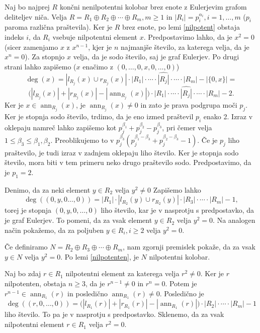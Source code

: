 \documentclass[a4paper, 12pt]{amsart}
\theoremstyle{definition} %
\theoremstyle{plain} %
\DeclareMathOperator{\ann}{ann}
\begin{document}
\proof
Naj bo najprej $R$ končni nenilpotentni kolobar brez enote z Eulerjevim grafom deliteljev niča. Velja $R=R_1\oplus R_2\oplus \cdots \oplus R_m, m\ge 1$ in $|R_i|=p_i^{\alpha_i}, i=1,\dots,m$ ($p_i$ paroma različna praštevila). Ker je $R$ brez enote, po lemi \ref{nilpotent} obstaja indeks $i$, da $R_i$ vsebuje nilpotentni element $x$. Predpostavimo lahko, da je $x^2 = 0$ (sicer zamenjamo $x$ z $x^{n-1}$, kjer je $n$ najmanjše število, za katerega velja, da je $x^n=0$). Za stopnjo $x$ velja, da je sodo število, saj je graf Eulerjev. Po  drugi  strani lahko zapišemo ($x$ enačimo z $(0,\dots,0,x,0,\dots,0)$)
$$
\deg(x) = |l_{R_j}(x) \cup r_{R_j}(x)|\cdot |R_1|\cdot \cdots \cdot \widehat{|R_j|} \cdot \cdots \cdot |R_m| - |\{0,x\}| = 
$$
$$
\big( |l_{R_j}(x)| + |r_{R_j}(x)| - |\ann_{R_j}(x)| \big)\cdot |R_1| \cdot \cdots \cdot \widehat{|R_j|} \cdot \cdots \cdot |R_m| - 2.
$$
Ker je $x\in \ann_{R_j}(x)$, je $\ann_{R_j}(x)\neq 0$ in zato je prava podgrupa moči $p_j$. Ker je stopnja sodo število, trdimo, da je eno izmed praštevil $p_i$ enako 2. Izraz v oklepaju namreč lahko zapišemo kot $p_j^{ \beta_1} + p_j^{\beta_2} - p_j^{\beta_3}$, pri čemer velja $1\le \beta_3 \le \beta_1,\beta_2$. Preoblikujemo to v $p_j^{\beta_3}(p_j^{\beta_1 - \beta_3} + p_j^{\beta_2 - \beta_3 } -1)$. Če je $p_j$ liho praštevilo, je tudi izraz v zadnjem oklepaju liho število. Ker je stopnja sodo število, mora biti v tem primeru neko drugo praštevilo sodo. Predpostavimo, da je $p_1 = 2$.

Denimo, da za neki element $y\in R_2$ velja $y^2 \neq 0$ Zapišemo lahko
$$
\deg((0,y,0\dots,0)) =  |R_1|\cdot |l_{R_2}(y)\cup r_{R_2}(y)|\cdot |R_3| \cdot \cdots \cdot |R_m| - 1,
$$
torej je stopnja $(0,y,0,\dots,0)$ liho število, kar je v nasprotju s predpostavko, da je graf Eulerjev. To pomeni, da za vsak element $y\in R_2$ velja $y^2 = 0$. Na analogen način pokažemo, da za poljuben $y\in R_i, i\ge 2$ velja $y^2 = 0$. 

Če definiramo $N=R_2 \oplus R_3 \oplus \cdots \oplus R_m$, nam zgornji premislek pokaže, da za vsak $y \in N$ velja $y^2 = 0$. Po lemi \ref{nilpotenten}, je $N$ nilpotentni kolobar.

Naj bo zdaj $r\in R_1$ nilpotentni element za katerega velja $r^2  \neq 0$. Ker je $r$ nilpotenten, obstaja $n\ge 3$, da je $r^{n-1}\neq 0$ in $r^n = 0$. Potem je $r^{n-1}\in \ann_{R_1}(r)$ in posledično $\ann_{R_1}(r) \neq 0$. Posledično je 
$$
\deg((r,0,\dots,0)) = \big( |l_{R_1}(r)| + |r_{R_1}(r)| - |\ann_{R_1}(r)| \big)\cdot |R_2| \cdot \cdots \cdot |R_m| - 1
$$
liho število. To pa je v nasprotju s predpostavko. Sklenemo, da za vsak nilpotentni element $r\in R_1$ velja $r^2=0$.
\end{document}
